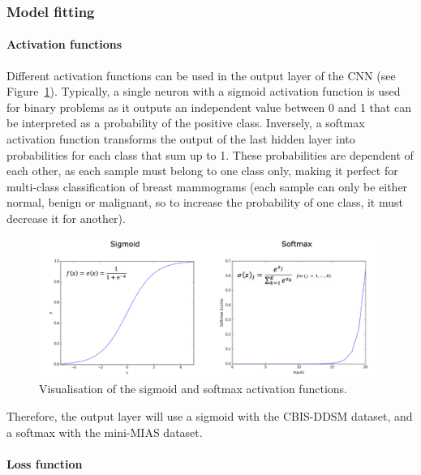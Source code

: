 \subsubsection{Model fitting}

\paragraph{Activation functions}

Different activation functions can be used in the output layer of the CNN (see Figure~\ref{fig:design-activation functions}). Typically, a single neuron with a sigmoid activation function is used for binary problems as it outputs an independent value between 0 and 1 that can be interpreted as a probability of the positive class. Inversely, a softmax activation function transforms the output of the last hidden layer into probabilities for each class that sum up to 1. These probabilities are dependent of each other, as each sample must belong to one class only, making it perfect for multi-class classification of breast mammograms (each sample can only be either normal, benign or malignant, so to increase the probability of one class, it must decrease it for another).

\begin{figure}[ht]
\centerline{\includegraphics[width=1.1\textwidth]{figures/design/activation functions.png}}
\caption{\label{fig:design-activation functions}Visualisation of the sigmoid and softmax activation functions.}
\end{figure}

Therefore, the output layer will use a sigmoid with the CBIS-DDSM dataset, and a softmax with the mini-MIAS dataset.

\paragraph{Loss function}

